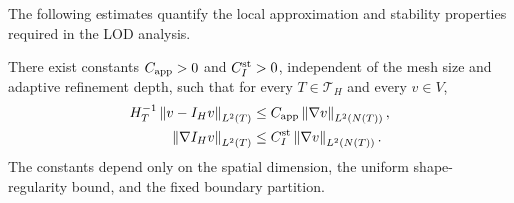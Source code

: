 The following estimates quantify the local approximation and stability
properties required in the LOD analysis.

\begin{lemma}
\label{lem:IH-local-properties}
There exist constants $C_{\rm app}>0$ and $C_I^{\rm st}>0$,
independent of the mesh size and adaptive refinement depth, such that
for every $T\in\mathcal T_H$ and every $v\in V$,
\begin{align}
  H_T^{-1}\left\lVert v-I_Hv\right\rVert_{L^2(T)}
  &\leq
  C_{\rm app}
  \left\lVert \nabla v\right\rVert_{L^2(N(T))},
  \label{eq:IH-approx}\\
  \left\lVert \nabla I_Hv\right\rVert_{L^2(T)}
  &\leq
  C_I^{\rm st}
  \left\lVert \nabla v\right\rVert_{L^2(N(T))}.
  \label{eq:IH-stability}
\end{align}
The constants depend only on the spatial dimension, the uniform
shape-regularity bound, and the fixed boundary partition.
\end{lemma}

